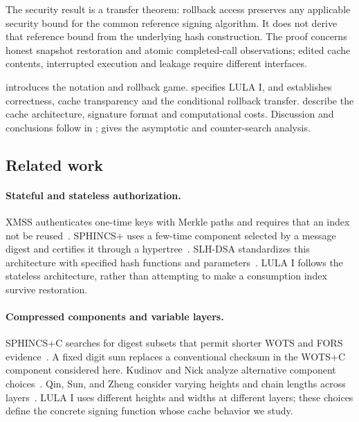 \documentclass[a4paper,envcountsame,runningheads]{llncs}
\begin{document}
The security result is a transfer theorem: rollback access preserves any applicable security bound for the common reference signing algorithm. It does not derive that reference bound from the underlying hash construction. The proof concerns honest snapshot restoration and atomic completed-call observations; edited cache contents, interrupted execution and leakage require different interfaces.

 introduces the notation and rollback game.  specifies LULA I, and  establishes correctness, cache transparency and the conditional rollback transfer.  describe the cache architecture, signature format and computational costs. Discussion and conclusions follow in ;  gives the asymptotic and counter-search analysis.

\subsection{Related work}\label{sec:related}
\paragraph{Stateful and stateless authorization.}
XMSS authenticates one-time keys with Merkle paths and requires that an index not be reused~\cite[Sections~4.1 and 4.1.9]{xmss}. SPHINCS+ uses a few-time component selected by a message digest and certifies it through a hypertree~\cite{sphincs}. SLH-DSA standardizes this architecture with specified hash functions and parameters~\cite{fips205}. LULA I follows the stateless architecture, rather than attempting to make a consumption index survive restoration.

\paragraph{Compressed components and variable layers.}
SPHINCS+C searches for digest subsets that permit shorter WOTS and FORS evidence~\cite{sphincsc}. A fixed digit sum replaces a conventional checksum in the WOTS+C component considered here. Kudinov and Nick analyze alternative component choices~\cite[Sections 5 and 13]{kn}. Qin, Sun, and Zheng consider varying heights and chain lengths across layers~\cite{variable}. LULA I uses different heights and widths at different layers; these choices define the concrete signing function whose cache behavior we study.
\end{document}
